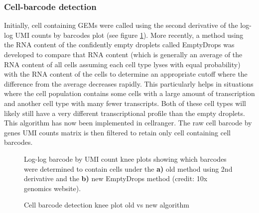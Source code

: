\subsubsection{Cell-barcode detection}
\par{
Initially, cell containing GEMs were called using the second derivative of the log-log UMI counts by barcodes plot (see figure \ref{figure:knee}). More recently, a method using the RNA content of the confidently empty droplets called EmptyDrops\cite{emptydrops} was developed to compare that RNA content (which is generally an average of the RNA content of all cells assuming each cell type lyses with equal probability) with the RNA content of the cells to determine an appropriate cutoff where the difference from the average decreases rapidly. This particularly helps in situations where the cell population contains some cells with a large amount of transcription and another cell type with many fewer transcripts. Both of these cell types will likely still have a very different transcriptional profile than the empty droplets. This algorithm has now been implemented in cellranger. The raw cell barcode by genes UMI counts matrix is then filtered to retain only cell containing cell barcodes.
}
\begin{figure}[htbp!]
\caption{Cell barcode detection knee plot old vs new algorithm}
\label{figure:knee}
\begin{centering}
\par{Log-log barcode by UMI count knee plots showing which barcodes were determined to contain cells under the \textbf{a)} old method using 2nd derivative and the \textbf{b)} new EmptyDrops method (credit: 10x genomics website).}
\end{centering}
\end{figure}

